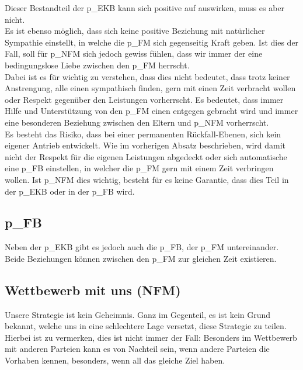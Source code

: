 
Dieser Bestandteil der \gls{p_EKB} kann sich positive auf \NFMOTwo auswirken, muss es aber nicht.\\

Es ist ebenso möglich, dass sich keine positive Beziehung mit natürlicher Sympathie einstellt, in welche die \gls{p_FM} sich gegenseitig Kraft geben. Ist dies der Fall, soll für \gls{p_NFM} sich jedoch gewiss fühlen, dass wir immer der eine bedingungslose Liebe zwischen den \gls{p_FM} herrscht.\\


Dabei ist es für \NFMOOne wichtig zu verstehen, dass dies nicht bedeutet, dass trotz keiner Anstrengung, alle einen sympathisch finden, gern mit einen Zeit verbracht wollen oder Respekt gegenüber den Leistungen vorherrscht. Es bedeutet, dass immer Hilfe und Unterstützung von den \gls{p_FM} einen entgegen gebracht wird und immer eine besonderen Beziehung zwischen den Eltern und \gls{p_NFM} vorherrscht.\\


Es besteht das Risiko, dass bei einer permanenten Rückfall-Ebenen, sich kein eigener Antrieb entwickelt. Wie im vorherigen Absatz beschrieben, wird damit nicht der Respekt für die eigenen Leistungen abgedeckt oder sich automatische eine \gls{p_FB} einstellen, in welcher die \gls{p_FM} gern mit einem Zeit verbringen wollen. Ist \gls{p_NFM} dies wichtig, besteht für es keine Garantie, dass dies Teil in der \gls{p_EKB} oder in der \gls{p_FB} wird.

\subsection{\gls{p_FB}} Neben der \gls{p_EKB} gibt es jedoch auch die \gls{p_FB}, der \gls{p_FM} untereinander. Beide Beziehungen können zwischen den \gls{p_FM} zur gleichen Zeit existieren.

\subsection{Wettbewerb mit uns (NFM)}
Unsere Strategie ist kein Geheimnis. Ganz im Gegenteil, es ist kein Grund bekannt, welche uns in eine schlechtere Lage versetzt, diese Strategie zu teilen. Hierbei ist zu vermerken, dies ist nicht immer der Fall: Besonders im Wettbewerb mit anderen Parteien kann es von Nachteil sein, wenn andere Parteien die Vorhaben kennen, besonders, wenn all das gleiche Ziel haben.\\



